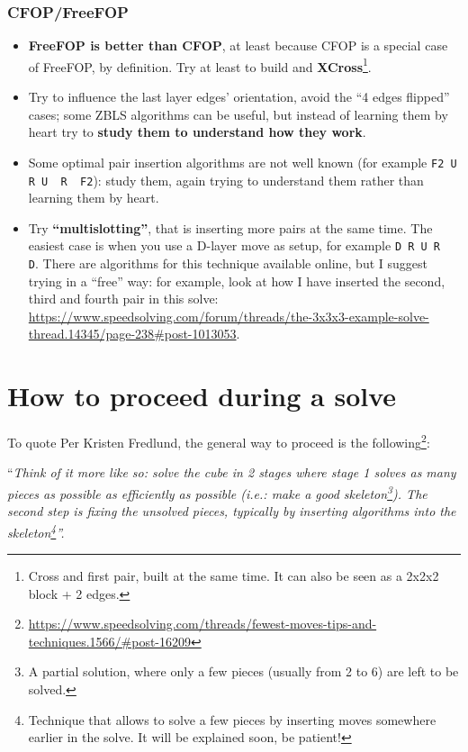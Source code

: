 \documentclass[11pt,a4paper]{book}
\newcommand{\p}{\textquotesingle}
\newcommand{\m}{\texttt}
\newcommand{\ps}{\p\,\,}
\begin{document}
\subsection{CFOP/FreeFOP}
\begin{itemize}
\item \textbf{FreeFOP is better than CFOP}, at least because CFOP is a special case of FreeFOP, by definition. Try at least to build and \textbf{XCross}\footnote{Cross and first pair, built at the same time. It can also be seen as a 2x2x2 block + 2 edges.}.
\item Try to influence the last layer edges' orientation, avoid the ``4 edges flipped'' cases; some ZBLS algorithms can be useful, but instead of learning them by heart try to \textbf{study them to understand how they work}.
\item Some optimal pair insertion algorithms are not well known (for example \m{F2 U R U\ps R\ps F2}): study them, again trying to understand them rather than learning them by heart.
\item Try \textbf{``multislotting''}, that is inserting more pairs at the same time. The easiest case is when you use a D-layer move as setup, for example \m{D R U R\ps D\p}. There are algorithms for this technique available online, but I suggest trying in a ``free'' way: for example, look at how I have inserted the second, third and fourth pair in this solve: \url{https://www.speedsolving.com/forum/threads/the-3x3x3-example-solve-thread.14345/page-238#post-1013053}.
\end{itemize}

\chapter{How to proceed during a solve}

To quote Per Kristen Fredlund, the general way to proceed is the following\footnote{\url{https://www.speedsolving.com/threads/fewest-moves-tips-and-techniques.1566/\#post-16209}}:

\begin{center}“\emph{Think of it more like so: solve the cube in 2 stages where stage 1 solves as many pieces as possible as efficiently as possible (i.e.: make a good skeleton\footnote{A partial solution, where only a few pieces (usually from 2 to 6) are left to be solved.}). The second step is fixing the unsolved pieces, typically by inserting algorithms into the skeleton\footnote{Technique that allows to solve a few pieces by inserting moves somewhere earlier in the solve. It will be explained soon, be patient!}''.}
\end{center}
\end{document}
